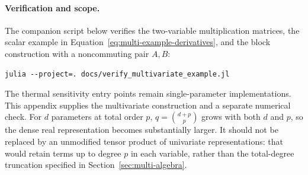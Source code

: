 \paragraph{Verification and scope.}
The companion script below verifies the two-variable multiplication matrices,
the scalar example in Equation~\eqref{eq:multi-example-derivatives}, and the
block construction with a noncommuting pair $A,B$:
\begin{verbatim}
julia --project=. docs/verify_multivariate_example.jl
\end{verbatim}
The thermal sensitivity entry points remain single-parameter implementations.
This appendix supplies the multivariate construction and a separate numerical
check. For $d$ parameters at total order $p$, $q=\binom{d+p}{p}$ grows with both
$d$ and $p$, so the dense real representation becomes substantially larger.
It should not be replaced by an unmodified tensor product of univariate
representations: that would retain terms up to degree $p$ in each variable,
rather than the total-degree truncation specified in Section~\ref{sec:multi-algebra}.
